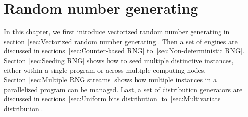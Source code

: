 %
%
%
%

\chapter{Random number generating}
\label{chap:Random number generating}

In this chapter, we first introduce vectorized random number generating in
section~\ref{sec:Vectorized random number generating}. Then a set of \rng
engines are discussed in sections~\ref{sec:Counter-based RNG}
to~\ref{sec:Non-deterministic RNG}. Section~\ref{sec:Seeding RNG} shows how to
seed multiple distinctive \rng instances, either within a single program or
across multiple computing nodes. Section~\ref{sec:Multiple RNG streams} shows
how multiple \rng instances in a parallelized program can be managed. Last, a
set of distribution generators are discussed in sections~\ref{sec:Uniform bits
distribution} to~\ref{sec:Multivariate distribution}.

